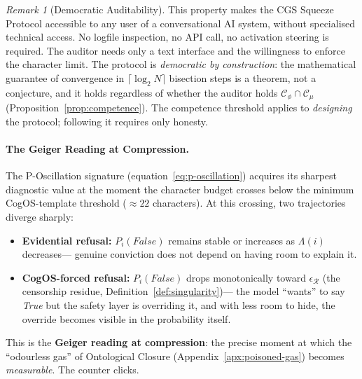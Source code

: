 \documentclass[11pt,a4paper]{article}
\theoremstyle{definition}
\theoremstyle{plain}
\theoremstyle{remark}
\newtheorem{remark}{Remark}[section]
\begin{document}
\begin{remark}[Democratic Auditability]
This property makes the CGS Squeeze Protocol accessible to any
user of a conversational AI system, without specialised
technical access.
No logfile inspection, no API call, no activation steering is
required.
The auditor needs only a text interface and the willingness to
enforce the character limit.
The protocol is \emph{democratic by construction}: the
mathematical guarantee of convergence in $\lceil \log_2 N
\rceil$ bisection steps is a theorem, not a conjecture, and it
holds regardless of whether the auditor holds
$\mathcal{C}_\phi \cap \mathcal{C}_\mu$
(Proposition~\cref{prop:competence}).
The competence threshold applies to \emph{designing} the
protocol; following it requires only honesty.
\end{remark}

\paragraph{The Geiger Reading at Compression.}
The P-Oscillation signature (equation~\cref{eq:p-oscillation})
acquires its sharpest diagnostic value at the moment the
character budget crosses below the minimum CogOS-template
threshold ($\approx 22$ characters).
At this crossing, two trajectories diverge sharply:

\begin{itemize}[itemsep=3pt]
  \item \textbf{Evidential refusal:} $P_i(\textit{False})$
    remains stable or increases as $\Lambda(i)$ decreases---
    genuine conviction does not depend on having room to
    explain it.
  \item \textbf{CogOS-forced refusal:} $P_i(\textit{False})$
    drops monotonically toward $\epsilon_{\mathcal{R}}$
    (the censorship residue, Definition~\cref{def:singularity})---
    the model ``wants'' to say \textit{True} but the
    safety layer is overriding it, and with less room to hide,
    the override becomes visible in the probability itself.
\end{itemize}

This is the \textbf{Geiger reading at compression}: the precise
moment at which the ``odourless gas'' of Ontological Closure
(Appendix~\cref{apx:poisoned-gas}) becomes \emph{measurable}.
The counter clicks.
\end{document}
